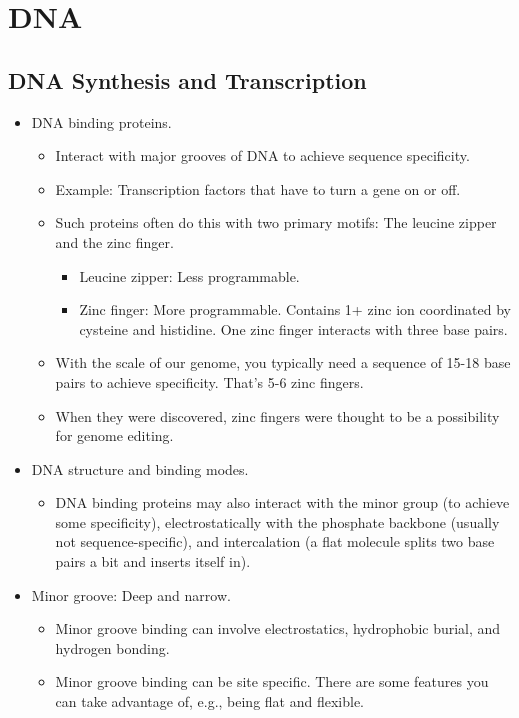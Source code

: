 \documentclass[../notes.tex]{subfiles}
\begin{document}
\chapter{DNA}
\section{DNA Synthesis and Transcription}
\begin{itemize}
    \item {}DNA binding proteins.
    \begin{itemize}
        \item Interact with major grooves of DNA to achieve sequence specificity.
        \item Example: Transcription factors that have to turn a gene on or off.
        \item Such proteins often do this with two primary motifs: The leucine zipper and the zinc finger.
        \begin{itemize}
            \item Leucine zipper: Less programmable.
            \item Zinc finger: More programmable. Contains 1+ zinc ion coordinated by cysteine and histidine. One zinc finger interacts with three base pairs.
        \end{itemize}
        \item With the scale of our genome, you typically need a sequence of 15-18 base pairs to achieve specificity. That's 5-6 zinc fingers.
        \item When they were discovered, zinc fingers were thought to be a possibility for genome editing.
    \end{itemize}
    \item DNA structure and binding modes.
    \begin{itemize}
        \item DNA binding proteins may also interact with the minor group (to achieve some specificity), electrostatically with the phosphate backbone (usually not sequence-specific), and intercalation (a flat molecule splits two base pairs a bit and inserts itself in).
    \end{itemize}
    \item Minor groove: Deep and narrow.
    \begin{itemize}
        \item Minor groove binding can involve electrostatics, hydrophobic burial, and hydrogen bonding.
        \item Minor groove binding can be site specific. There are some features you can take advantage of, e.g., being flat and flexible.

\end{itemize}
\end{itemize}
\end{document}
